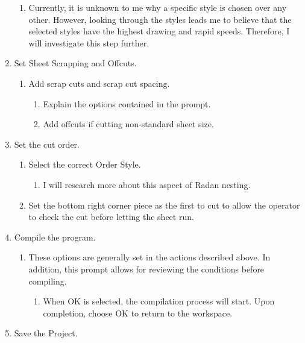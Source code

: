 \documentclass[11pt, a4paper, oneside]{report}
\begin{document}
\begin{enumerate}
        \begin{enumerate}
            \item Currently, it is unknown to me why a specific style is chosen over any other. However, looking through the styles leads me to believe that the selected styles have the highest drawing and rapid speeds. Therefore, I will investigate this step further.
        \end{enumerate}
    \item Set Sheet Scrapping and Offcuts.
        \begin{enumerate}
            \item Add scrap cuts and scrap cut spacing.
                \begin{enumerate}
                    \item Explain the options contained in the prompt.
                    \item Add offcuts if cutting non-standard sheet size.
                \end{enumerate}
        \end{enumerate}
    \item Set the cut order.
        \begin{enumerate}
            \item Select the correct Order Style.
                \begin{enumerate}
                    \item I will research more about this aspect of Radan nesting.
                \end{enumerate}
            \item Set the bottom right corner piece as the first to cut to allow the operator to check the cut before letting the sheet run.
        \end{enumerate}
    \item Compile the program.
        \begin{enumerate}
            \item These options are generally set in the actions described above. In addition, this prompt allows for reviewing the conditions before compiling.
                \begin{enumerate}
                    \item When OK is selected, the compilation process will start. Upon completion, choose OK to return to the workspace.
                \end{enumerate}
        \end{enumerate}
    \item Save the Project.

\end{enumerate}
\end{document}
